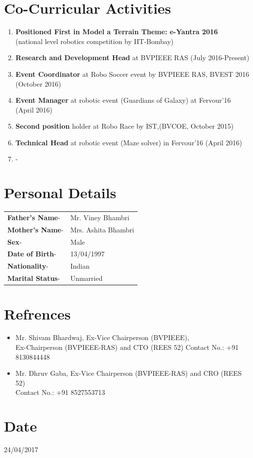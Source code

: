 \documentclass[11pt]{article}
\begin{document}
\begin{minipage}{1.5\linewidth}
\section{\color{green}Co-C\color{black}urricular Activities}
\begin{enumerate}
\item \textbf{Positioned First in Model a Terrain Theme: e-Yantra 2016} \\(national level robotics competition  by IIT-Bombay) 
\item \textbf{Research  and  Development Head} at BVPIEEE RAS (July 2016-Present)
\item \textbf{Event Coordinator} at Robo Soccer event by BVPIEEE RAS, BVEST 2016 \\(October 2016)
\item \textbf{Event Manager} at robotic event (Guardians of Galaxy) at Fervour'16 (April 2016)
\item \textbf{Second position} holder at Robo Race by IST,(BVCOE, October 2015)
\item \textbf{Technical Head} at robotic event (Maze solver) in Fervour'16 (April 2016)
\item -

\end{enumerate}
\end{minipage}

\begin{minipage}{1.5\linewidth}
\section{\color{yellow}Per\color{black}sonal Details}
\begin{tabular}{l l}
\textbf{Father's Name}-& Mr. Viney Bhambri\\ 
\textbf{Mother's Name}-& Mrs. Ashita Bhambri\\
\textbf{Sex}-& Male\\
\textbf{Date of Birth}-& 13/04/1997\\
\textbf{Nationality}-& Indian\\
\textbf{Marital Status}-& Unmarried\\
\end{tabular}
\section{\color{magenta}Ref\color{black}rences}
\begin{itemize}
\item Mr. Shivam Bhardwaj, Ex-Vice Chairperson (BVPIEEE),\\Ex-Chairperson (BVPIEEE-RAS) and CTO (REES 52)
Contact No.: +91 8130844448
\item Mr. Dhruv Gaba, Ex-Vice Chairperson (BVPIEEE-RAS) and CRO (REES 52)\\
Contact No.: +91 8527553713
\end{itemize}

\section{\color{green}Dat\color{black}e}
24/04/2017

\end{minipage}
\end{document}
